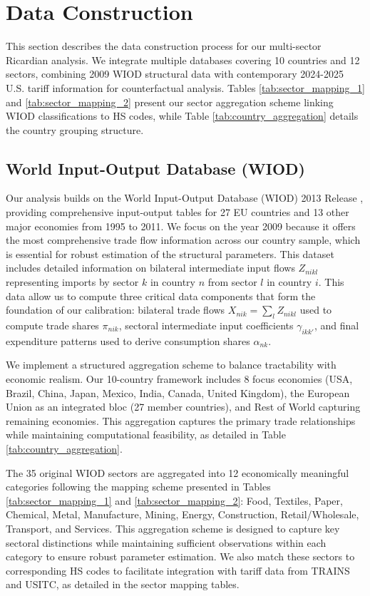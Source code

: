 \section{Data Construction}

This section describes the data construction process for our multi-sector Ricardian analysis. We integrate multiple databases covering 10 countries and 12 sectors, combining 2009 WIOD structural data with contemporary 2024-2025 U.S. tariff information for counterfactual analysis. Tables \ref{tab:sector_mapping_1} and \ref{tab:sector_mapping_2} present our sector aggregation scheme linking WIOD classifications to HS codes, while Table \ref{tab:country_aggregation} details the country grouping structure.

\subsection{World Input-Output Database (WIOD)}

Our analysis builds on the World Input-Output Database (WIOD) 2013 Release \citep{timmer2015illustrated}, providing comprehensive input-output tables for 27 EU countries and 13 other major economies from 1995 to 2011. We focus on the year 2009 because it offers the most comprehensive trade flow information across our country sample, which is essential for robust estimation of the structural parameters. This dataset includes detailed information on bilateral intermediate input flows $Z_{nikl}$ representing imports by sector $k$ in country $n$ from sector $l$ in country $i$. This data allow us to compute three critical data components that form the foundation of our calibration: bilateral trade flows $X_{nik} = \sum_{l} Z_{nikl}$ used to compute trade shares $\pi_{nik}$, sectoral intermediate input coefficients $\gamma_{ikk'}$, and final expenditure patterns used to derive consumption shares $\alpha_{nk}$.

We implement a structured aggregation scheme to balance tractability with economic realism. Our 10-country framework includes 8 focus economies (USA, Brazil, China, Japan, Mexico, India, Canada, United Kingdom), the European Union as an integrated bloc (27 member countries), and Rest of World capturing remaining economies. This aggregation captures the primary trade relationships while maintaining computational feasibility, as detailed in Table \ref{tab:country_aggregation}. 

The 35 original WIOD sectors are aggregated into 12 economically meaningful categories following the mapping scheme presented in Tables \ref{tab:sector_mapping_1} and \ref{tab:sector_mapping_2}: Food, Textiles, Paper, Chemical, Metal, Manufacture, Mining, Energy, Construction, Retail/Wholesale, Transport, and Services. This aggregation scheme is designed to capture key sectoral distinctions while maintaining sufficient observations within each category to ensure robust parameter estimation. We also match these sectors to corresponding HS codes to facilitate integration with tariff data from TRAINS and USITC, as detailed in the sector mapping tables.

